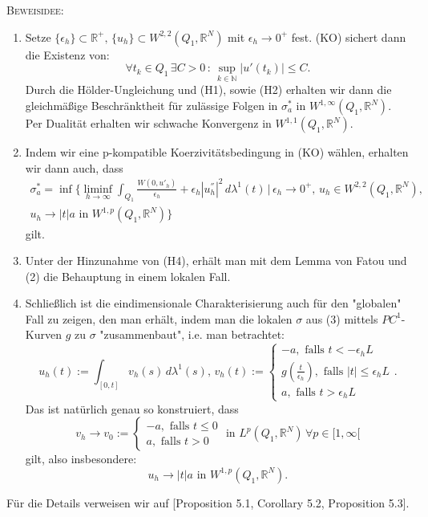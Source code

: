 \textsc{Beweisidee:}
\begin{enumerate}
    \item Setze \(\{\epsilon_h\} \subset \mathbb{R}^+, \, \{u_h\} \subset W^{2,2}(Q_1,\mathbb{R}^N)\) mit \(\epsilon_h \to 0^+\) fest. (KO) sichert dann die Existenz von:
    \begin{equation}
        \forall t_k \in Q_1 \, \exists C > 0 \, : \, \sup_{k \in \mathbb{N}} |u'(t_k)| \leq C.
    \end{equation}
    Durch die Hölder-Ungleichung und (H1), sowie (H2) erhalten wir dann die gleichmäßige Beschränktheit für zulässige Folgen in \(\sigma^*_a\) in \(W^{1,\infty}(Q_1,\mathbb{R}^N)\). Per Dualität erhalten wir schwache Konvergenz in \(W^{1,1}(Q_1,\mathbb{R}^N)\). 
    \item Indem wir eine p-kompatible Koerzivitätsbedingung in (KO) wählen, erhalten wir dann auch, dass 
    \begin{equation}
    \begin{array}{l}
        \sigma^*_a = \inf \{\liminf_{h \to \infty} \int_{Q_1} \frac{W(0,u'_h)}{\epsilon_h} + \epsilon_h |u^{''}_h|^2 \,d\lambda^1(t) \, | \, \epsilon_h \to 0^+, \, u_h \in W^{2,2}(Q_1, \mathbb{R}^N), \\ 
        u_h \to |t|a \text{ in } W^{1,p}(Q_1, \mathbb{R}^N)\}
    \end{array}
    \end{equation}
    gilt.
    \item Unter der Hinzunahme von (H4), erhält man mit dem Lemma von Fatou und (2) die Behauptung in einem lokalen Fall.
    \item Schließlich ist die eindimensionale Charakterisierung auch für den "globalen" Fall zu zeigen, den man erhält, indem man die lokalen \(\sigma\) aus (3) mittels \(PC^1\)-Kurven \(g\) zu \(\sigma\) "zusammenbaut", i.e. man betrachtet:
    \begin{equation}
        u_h(t) := \int_{[0,t]} v_h (s) \,d\lambda^1(s), \, v_h(t) := \begin{cases}
            -a, \text{ falls }t < -\epsilon_h L \\
            g(\frac{t}{\epsilon_h}), \text{ falls }|t| \leq \epsilon_h L \\
            a, \text{ falls }t > \epsilon_h L
        \end{cases}.
    \end{equation}
    Das ist natürlich genau so konstruiert, dass 
    \begin{equation}
        v_h \to v_0 := \begin{cases}
            -a, \text{ falls }t \leq 0 \\
            a, \text{ falls }t > 0
        \end{cases}
        \text{ in }L^p(Q_1,\mathbb{R}^N) \, \forall p \in [1,\infty[
    \end{equation}
    gilt, also insbesondere:
    \begin{equation}
        u_h \to |t|a \text{ in }W^{1,p}(Q_1,\mathbb{R}^N).
    \end{equation}
\end{enumerate}
Für die Details verweisen wir auf \cite{ContiTwoGradientPhase} [Proposition 5.1, Corollary 5.2, Proposition 5.3]. \QEDB

